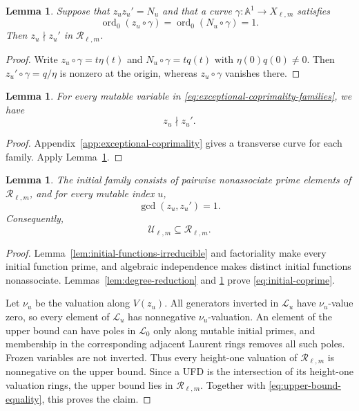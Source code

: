 \documentclass[11pt]{amsart}
\newtheorem{lemma}[theorem]{Lemma}
\theoremstyle{definition}
\theoremstyle{remark}
\newcommand{\cR}{\mathcal R}
\newcommand{\cU}{\mathcal U}
\begin{document}
\begin{lemma}\label{lem:transverse-curve-criterion}
Suppose that $z_uz_u'=N_u$ and that a curve
$\gamma:\mathbb A^1\to X_{\ell,m}$ satisfies
\[ \operatorname{ord}_0(z_u\circ\gamma) =\operatorname{ord}_0(N_u\circ\gamma)=1. \]
Then $z_u\nmid z_u'$ in $\cR_{\ell,m}$.
\end{lemma}

\begin{proof}
Write $z_u\circ\gamma=t\eta(t)$ and
$N_u\circ\gamma=tq(t)$ with $\eta(0)q(0)\ne0$.  Then
$z_u'\circ\gamma=q/\eta$ is nonzero at the origin, whereas
$z_u\circ\gamma$ vanishes there.
\end{proof}

\begin{lemma}\label{lem:exceptional-directions}
For every mutable variable in \eqref{eq:exceptional-coprimality-families}, we have
\[ z_u\nmid z_u'. \]
\end{lemma}

\begin{proof}
Appendix~\ref{app:exceptional-coprimality} gives a transverse curve for
each family.  Apply Lemma~\ref{lem:transverse-curve-criterion}.
\end{proof}

\begin{lemma}\label{lem:initial-coprimality}
The initial family consists of pairwise nonassociate prime elements of
$\cR_{\ell,m}$, and for every mutable index $u$,
\begin{equation}
 \gcd(z_u,z_u')=1.
 \label{eq:initial-coprime}
\end{equation}
Consequently,
\begin{equation}
 \cU_{\ell,m}\subseteq\cR_{\ell,m}.
 \label{eq:upper-bound-inclusion}
\end{equation}
\end{lemma}

\begin{proof}
Lemma~\ref{lem:initial-functions-irreducible} and factoriality make every
initial function prime, and algebraic independence makes distinct initial
functions nonassociate.  Lemmas~\ref{lem:degree-reduction} and
\ref{lem:exceptional-directions} prove
\eqref{eq:initial-coprime}.

Let $\nu_u$ be the valuation along $V(z_u)$.  All generators inverted in
$\mathcal L_u$ have $\nu_u$-value zero, so every element of
$\mathcal L_u$ has nonnegative $\nu_u$-valuation.  An element of the upper
bound can have poles in $\mathcal L_0$ only along mutable initial primes,
and membership in the corresponding adjacent Laurent rings removes all
such poles.  Frozen variables are not inverted.  Thus every height-one
valuation of $\cR_{\ell,m}$ is nonnegative on the upper bound. Since a UFD is the intersection
of its height-one valuation rings, the upper bound lies in
$\cR_{\ell,m}$.  Together with \eqref{eq:upper-bound-equality}, this proves the claim.
\end{proof}
\end{document}
